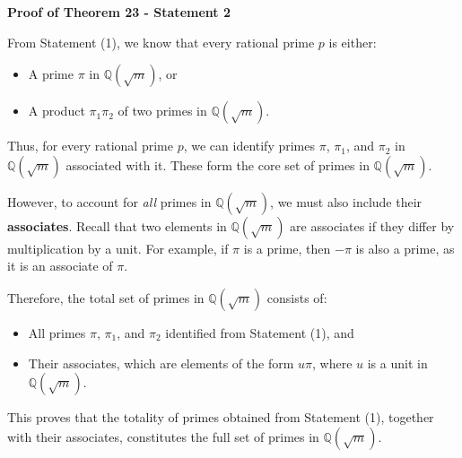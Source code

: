 \documentclass{article}
\newenvironment{proofbox}
  {\begin{mdframed}[linewidth=1pt,linecolor=black,backgroundcolor=white]\noindent\ignorespaces}
  {\end{mdframed}}
\begin{document}
\textbf{Proof of Theorem 23 - Statement 2}\\
\begin{proofbox}
    From Statement (1), we know that every rational prime $p$ is either:
\begin{itemize}
    \item A prime $\pi$ in $\mathbb{Q}(\sqrt{m})$, or
    \item A product $\pi_1 \pi_2$ of two primes in $\mathbb{Q}(\sqrt{m})$.
\end{itemize}

Thus, for every rational prime $p$, we can identify primes $\pi$, $\pi_1$, and $\pi_2$ in $\mathbb{Q}(\sqrt{m})$ associated with it. These form the core set of primes in $\mathbb{Q}(\sqrt{m})$.

However, to account for \textit{all} primes in $\mathbb{Q}(\sqrt{m})$, we must also include their \textbf{associates}. Recall that two elements in $\mathbb{Q}(\sqrt{m})$ are associates if they differ by multiplication by a unit. For example, if $\pi$ is a prime, then $-\pi$ is also a prime, as it is an associate of $\pi$.

Therefore, the total set of primes in $\mathbb{Q}(\sqrt{m})$ consists of:
\begin{itemize}
    \item All primes $\pi$, $\pi_1$, and $\pi_2$ identified from Statement (1), and
    \item Their associates, which are elements of the form $u \pi$, where $u$ is a unit in $\mathbb{Q}(\sqrt{m})$.
\end{itemize}

This proves that the totality of primes obtained from Statement (1), together with their associates, constitutes the full set of primes in $\mathbb{Q}(\sqrt{m})$.
\end{proofbox}
\end{document}
